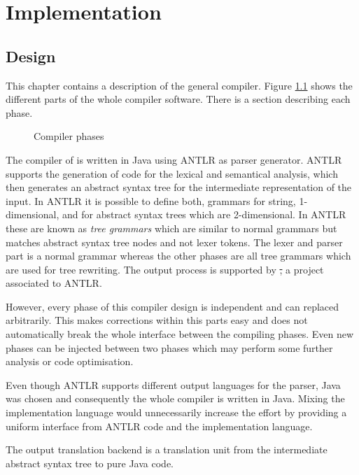 \chapter{Implementation}
\section{Design}
This chapter contains a description of the general compiler. Figure
\ref{fig:compilerPhase} shows the different parts of the whole compiler
software. There is a section describing each phase.

\begin{figure}[ht]
	\centerline{}
	\caption{Compiler phases}
	\label{fig:compilerPhase}
\end{figure}

The compiler of \ooplss is written in Java using
ANTLR as parser generator. ANTLR supports the generation of code for the lexical
and semantical analysis, which then generates an abstract syntax tree for
the intermediate representation of the input. In ANTLR it is possible to
define both, grammars for string, 1-dimensional, and for
abstract syntax trees which are 2-dimensional. In ANTLR these are known
as \emph{tree grammars} which are similar to normal grammars but matches
abstract syntax tree nodes and not lexer tokens. The lexer and parser
part is a normal grammar whereas the other phases are all tree grammars
which are used for tree rewriting.
The output process is supported by
\st, a project associated to ANTLR.

However, every phase of this compiler design is independent and can 
replaced arbitrarily. This makes corrections within this parts easy and
does not automatically break the whole interface between the compiling
phases. Even new phases can be injected between two phases which may 
perform some further analysis or code optimisation.

Even though ANTLR supports different output languages for the parser, Java was
chosen and consequently the whole compiler is written in Java. Mixing
the implementation language would unnecessarily increase the effort
by providing a uniform interface from ANTLR code and the implementation
language.

The output translation backend is a translation unit from the
intermediate abstract syntax tree to pure Java code.

